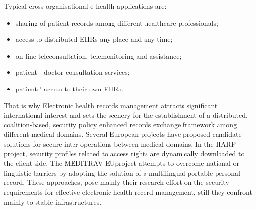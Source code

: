 \bigbreak
Typical cross-organisational e-health applications are\cite{ruotsalainenCrossplatformModelSecure2004}: 
\begin{itemize}
\item sharing of patient records among different healthcare professionals; 
\item access to distributed EHRs any place and any time; 
\item on-line teleconsultation, telemonitoring and assistance; 
\item patient—doctor consultation services;
\item patients’ access to their own EHRs.
\end{itemize}

\bigbreak
That is why Electronic health records management attracts significant international interest and sets the scenery for the establishment of a distributed, coalition-based, security policy enhanced records exchange framework among different medical domains. Several European projects have proposed candidate solutions for secure inter-operations between medical domains. In the HARP project, security profiles related to access rights are dynamically downloaded to the client side. The MEDITRAV EUproject attempts to overcome national or linguistic barriers by adopting the solution of a multilingual portable personal record. These approaches, pose mainly their research effort on the security requirements for effective electronic health record management, still they confront mainly to stable infrastructures\cite{belsisPervasiveSecureElectronic2005}.